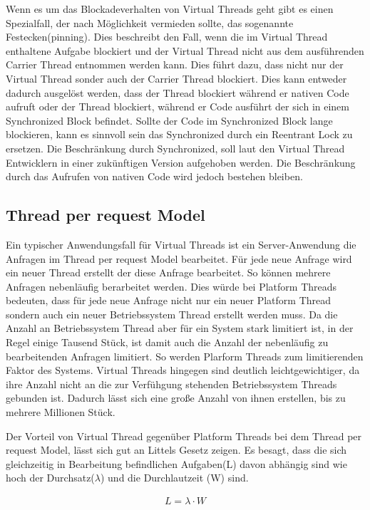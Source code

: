 \documentclass[fontsize=12pt,paper=a4,twoside=semi,parskip=half-,headsepline,headinclude]{scrreprt}
\begin{document}
Wenn es um das Blockadeverhalten von Virtual Threads geht gibt es einen Spezialfall, der nach Möglichkeit vermieden sollte, das sogenannte Festecken(pinning). Dies beschreibt den Fall, wenn die im Virtual Thread enthaltene Aufgabe blockiert und der Virtual Thread nicht aus dem ausführenden Carrier Thread entnommen werden kann. Dies führt dazu, dass nicht nur der Virtual Thread sonder auch der Carrier Thread blockiert. Dies kann entweder dadurch ausgelöst werden, dass der Thread blockiert während er nativen Code aufruft oder der Thread blockiert, während er Code ausführt der sich in einem Synchronized Block befindet. Sollte der Code im Synchronized Block lange blockieren, kann es sinnvoll sein das Synchronized durch ein Reentrant Lock zu ersetzen. Die Beschränkung durch Synchronized, soll laut den Virtual Thread Entwicklern in einer zukünftigen Version aufgehoben werden. Die Beschränkung durch das Aufrufen von nativen Code wird jedoch bestehen bleiben.\cite{Bateman2024}

\subsection{Thread per request Model}

Ein typischer Anwendungsfall für Virtual Threads ist ein Server-Anwendung die Anfragen im Thread per request Model bearbeitet. Für jede neue Anfrage wird ein neuer Thread erstellt der diese Anfrage bearbeitet. So können mehrere Anfragen nebenläufig berarbeitet werden. Dies würde bei Platform Threads bedeuten, dass für jede neue Anfrage nicht nur ein neuer Platform Thread sondern auch ein neuer Betriebssystem Thread erstellt werden muss. Da die Anzahl an Betriebssystem Thread aber für ein System stark limitiert ist, in der Regel einige Tausend Stück, ist damit auch die Anzahl der nebenläufig zu bearbeitenden Anfragen limitiert. So werden Plarform Threads zum limitierenden Faktor des Systems. Virtual Threads hingegen sind deutlich leichtgewichtiger, da ihre Anzahl nicht an die zur Verfühgung stehenden Betriebssystem Threads gebunden ist. Dadurch lässt sich eine große Anzahl von ihnen erstellen, bis zu mehrere Millionen Stück.

Der Vorteil von Virtual Thread gegenüber Platform Threads bei dem Thread per request Model, lässt sich gut an Littels Gesetz zeigen. Es besagt, dass die sich gleichzeitig in Bearbeitung befindlichen Aufgaben(L) davon abhängig sind wie hoch der Durchsatz($\lambda$) und die Durchlautzeit (W) sind.\cite{Little_1961}

\begin{eqnarray}
	L = \lambda \cdot W \nonumber
\end{eqnarray}
\end{document}
